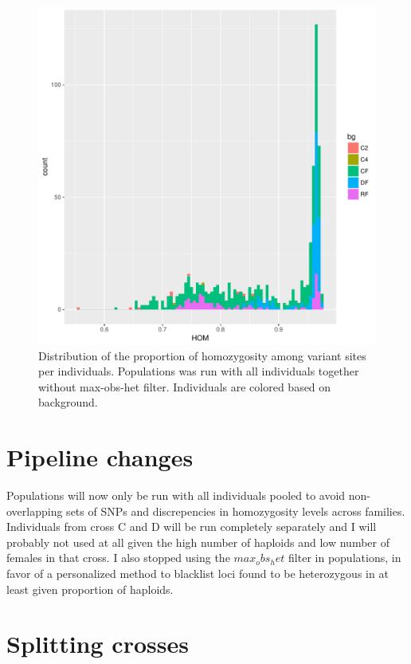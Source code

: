 \documentclass[10pt,a4paper]{report}
\begin{document}
\begin{figure}
\begin{center}
\includegraphics[width=\textwidth]{final_samples/hom_bg_popgroup_d20_CD.pdf}
\caption{Distribution of the proportion of homozygosity among variant sites per individuals. Populations was run with all individuals together without max-obs-het filter. Individuals are colored based on background.}
\label{CD_hom_grouped}
\end{center}
\end{figure}

\section{Pipeline changes}

Populations will now only be run with all individuals pooled to avoid non-overlapping sets of SNPs and discrepencies in homozygosity levels across families. Individuals from cross C and D will be run completely separately and I will probably not used at all given the high number of haploids and low number of females in that cross. I also stopped using the $max_obs_het$ filter in populations, in favor of a personalized method to blacklist loci found to be heterozygous in at least given proportion of haploids.

\section{Splitting crosses}
\end{document}
